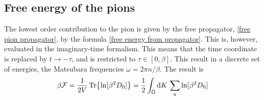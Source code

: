 \subsection{Free energy of the pions}
The lowest order contribution to the pion is given by the free propagator, \autoref{free pion propagator}, by the formula \autoref{free energy from propagator}.
This is, however, evaluated in the imaginary-time formalism.
This means that the time coordinate is replaced by $t \rightarrow - \tau$, and is restricted to $\tau \in [0, \beta]$.
This result in a discrete set of energies, the Matsubara frequencies $\omega = 2 \pi n / \beta$.
The result is
\begin{equation}
    \beta \mathcal{F} = \frac{1}{2V} \Tr{\ln[\beta^2 D_0]} 
    = \frac{1}{2} \int_{\tilde \Omega} \dd K \, \sum_a \ln[\beta^2 D_0]
\end{equation}

